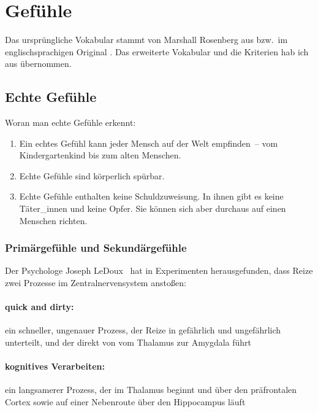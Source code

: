 \section{Gefühle}
\label{gefuehle}

Das ursprüngliche Vokabular stammt von Marshall Rosenberg aus \cite[S.~216]{gfk-rosenberg} bzw.~im englischsprachigen Original \cite[S.~210]{nvc-rosenberg}. Das erweiterte Vokabular und die Kriterien hab ich aus \cite[S.~56~f]{gfk-dummies} übernommen.


\subsection{Echte Gefühle}

Woran man echte Gefühle erkennt:

\begin{enumerate}
 \item Ein echtes Gefühl kann jeder Mensch auf der Welt empfinden~-- vom Kindergartenkind bis zum alten Menschen.
 \item Echte Gefühle sind körperlich spürbar.
 \item Echte Gefühle enthalten keine Schuldzuweisung. In ihnen gibt es keine Täter\_innen und keine Opfer. Sie können sich aber durchaus auf einen Menschen richten.
\end{enumerate}

\subsubsection{Primärgefühle und Sekundärgefühle}

Der Psychologe Joseph LeDoux~\cite{emotional-brain} hat in Experimenten herausgefunden, dass Reize zwei Prozesse im Zentralnervensystem anstoßen:

\paragraph{\glqq quick and dirty\grqq:} ein schneller, ungenauer Prozess, der Reize in \glqq gefährlich\grqq{} und \glqq ungefährlich\grqq{} unterteilt, und der direkt von vom Thalamus zur Amygdala führt
\paragraph{kognitives Verarbeiten:} ein langsamerer Prozess, der im Thalamus beginnt und über den präfrontalen Cortex sowie auf einer Nebenroute über den Hippocampus läuft

